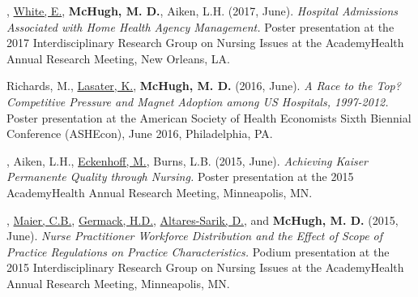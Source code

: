 \documentclass[10pt,]{article}
\begin{document}
{{{{{{{{{{{{{{\begin{hangparas}{.25in}{1}
\end{hangparas}

\vspace{4mm}

\begin{hangparas}{.25in}{1}

, {\underline {White, E.}}, {\textbf {McHugh, M. D.}}, Aiken, L.H. (2017, June). {\textit {Hospital Admissions Associated with Home Health Agency Management.}} Poster presentation at the 2017 Interdisciplinary Research Group on Nursing Issues at the AcademyHealth Annual Research Meeting, New Orleans, LA.

\end{hangparas}

\vspace{4mm}

\begin{hangparas}{.25in}{1}

\*Richards, M., {\underline {Lasater, K.}}, {\textbf {McHugh, M. D.}} (2016, June). {\textit {A Race to the Top? Competitive Pressure and Magnet Adoption among US Hospitals, 1997-2012.}} Poster presentation at the American Society of Health Economists Sixth Biennial Conference (ASHEcon), June 2016, Philadelphia, PA.

\end{hangparas}

\vspace{4mm}

\begin{hangparas}{.25in}{1}

, Aiken, L.H., {\underline {Eckenhoff, M.}}, Burns, L.B. (2015, June). {\textit {Achieving Kaiser Permanente Quality through Nursing.}} Poster presentation at the 2015 AcademyHealth Annual Research Meeting, Minneapolis, MN.

\end{hangparas}

\vspace{4mm}

\begin{hangparas}{.25in}{1}

, {\underline {Maier, C.B.}}, {\underline {Germack, H.D.}}, {\underline {Altares-Sarik, D.}}, and {\textbf {McHugh, M. D.}} (2015, June). {\textit {Nurse Practitioner Workforce Distribution and the Effect of Scope of Practice Regulations on Practice Characteristics.}} Podium presentation at the 2015 Interdisciplinary Research Group on Nursing Issues at the AcademyHealth Annual Research Meeting, Minneapolis, MN.


\end{hangparas}}}}}}}}}}}}}}}
\end{document}
